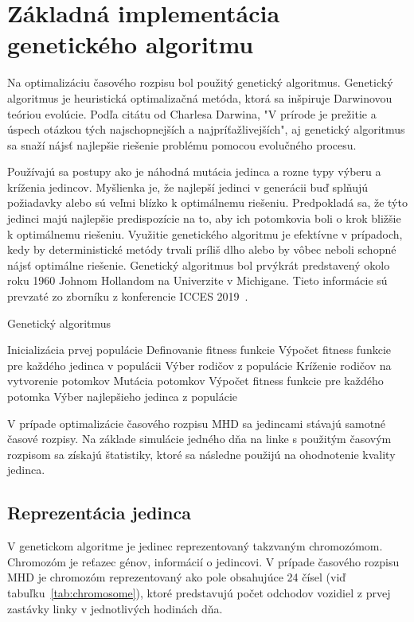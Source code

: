 \section{Základná implementácia genetického algoritmu}\label{implementacia_genetickeho_algoritmu}
Na optimalizáciu časového rozpisu bol použitý genetický algoritmus.
Genetický algoritmus je heuristická optimalizačná metóda, ktorá sa inšpiruje Darwinovou teóriou evolúcie.
Podľa citátu od Charlesa Darwina, "V prírode je prežitie a úspech otázkou tých najschopnejších a najpríťažlivejších",
aj genetický algoritmus sa snaží nájsť najlepšie riešenie problému pomocou evolučného procesu.

Používajú sa postupy ako je náhodná mutácia jedinca a rozne typy výberu a kríženia jedincov.
Myšlienka je, že najlepší jedinci v generácii buď splňujú požiadavky alebo sú veľmi blízko k optimálnemu riešeniu.
Predpokladá sa, že týto jedinci majú najlepšie predispozície na to, aby ich potomkovia boli o krok bližšie k optimálnemu riešeniu.
Využitie genetického algoritmu je efektívne v prípadoch, kedy by deterministické metódy trvali príliš dlho alebo by vôbec neboli schopné nájsť optimálne riešenie.
Genetický algoritmus bol prvýkrát predstavený okolo roku 1960 Johnom Hollandom na Univerzite v Michigane.
Tieto informácie sú prevzaté zo zborníku z konferencie ICCES 2019~\cite{immanuel2019genetic}.

\vspace*{\dimexpr0.5\baselineskip\relax}
\begin{algorithm}[H]\label{algoritmus_geneticky_algoritmus}
\caption{Genetický algoritmus}
  Inicializácia prvej populácie\;
  Definovanie fitness funkcie\;
  Výpočet fitness funkcie pre každého jedinca v populácii\;
   {
    Výber rodičov z populácie\;
    Kríženie rodičov na vytvorenie potomkov\;
    Mutácia potomkov\;
    Výpočet fitness funkcie pre každého potomka\;
  }
  Výber najlepšieho jedinca z populácie\;
\end{algorithm}

V prípade optimalizácie časového rozpisu MHD sa jedincami stávajú samotné časové rozpisy.
Na základe simulácie jedného dňa na linke s použitým časovým rozpisom sa získajú štatistiky, ktoré sa následne použijú na ohodnotenie kvality jedinca.

\subsection*{Reprezentácia jedinca}
V genetickom algoritme je jedinec reprezentovaný takzvaným chromozómom.
Chromozóm je reťazec génov, informácií o jedincovi.
V prípade časového rozpisu MHD je chromozóm reprezentovaný ako pole obsahujúce 24 čísel (viď tabuľku~\ref{tab:chromosome}), ktoré predstavujú počet odchodov vozidiel z prvej zastávky linky v jednotlivých hodinách dňa.

